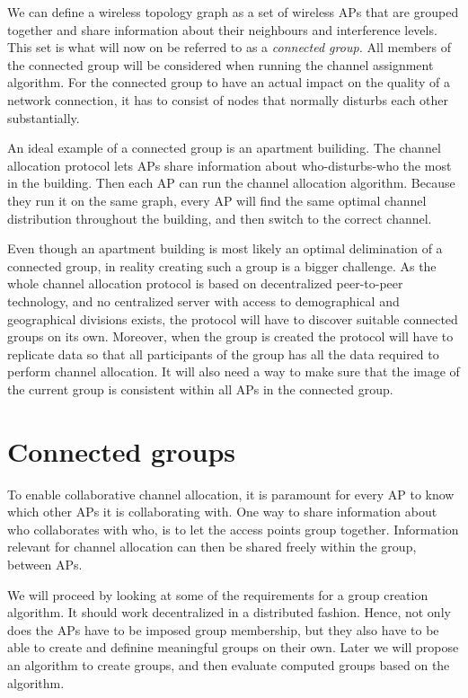 \documentclass[a4paper,UKenglish]{report}
\begin{document}
We can define a wireless topology graph as a set of wireless APs that are grouped together and share information about their neighbours and interference levels.
This set is what will now on be referred to as a \textit{connected group.} All members of the connected group will be considered when running the channel assignment algorithm.
For the connected group to have an actual impact on the quality of a network connection, it has to consist of nodes that normally disturbs each other substantially.

An ideal example of a connected group is an apartment builiding. The channel allocation protocol lets APs share information about who-disturbs-who the most in the building.
Then each AP can run the channel allocation algorithm. Because they run it on the same graph, every AP will find the same optimal channel distribution throughout the building,
and then switch to the correct channel. 

Even though an apartment building is most likely an optimal delimination of a connected group, in reality creating such a group is a bigger challenge. As the whole channel allocation
protocol is based on decentralized peer-to-peer technology, and no centralized server with access to demographical and geographical divisions exists, the protocol will
have to discover suitable connected groups on its own. Moreover, when the group is created the protocol will have to replicate data so that
all participants of the group has all the data required to perform channel allocation. It will also need a way to make sure that the image of the current group
is consistent within all APs in the connected group. 
\chapter{Connected groups}
To enable collaborative channel allocation, it is paramount for every AP to know which other APs it is collaborating with.
One way to share information about who collaborates with who, is to let the access points group together. Information relevant for channel
allocation can then be shared freely within the group, between APs.

We will proceed by looking at some of the requirements for a group creation algorithm. It should work decentralized in a distributed fashion.
Hence, not only does the APs have to be imposed group membership, but they also have to be able to create and definine meaningful groups on their own.
Later we will propose an algorithm to create groups, and then evaluate computed groups based on the algorithm.
\end{document}
